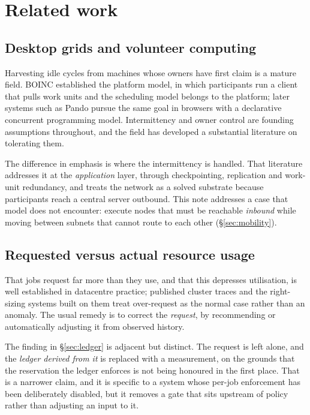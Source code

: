 \section{Related work}
\label{sec:related}

\subsection{Desktop grids and volunteer computing}

Harvesting idle cycles from machines whose owners have first claim is a mature
field. BOINC established the platform model, in which participants run a client
that pulls work units and the scheduling model belongs to the platform; later
systems such as Pando pursue the same goal in browsers with a declarative
concurrent programming model. Intermittency and owner control are founding
assumptions throughout, and the field has developed a substantial literature on
tolerating them.

The difference in emphasis is where the intermittency is handled. That
literature addresses it at the \emph{application} layer, through checkpointing,
replication and work-unit redundancy, and treats the network as a solved
substrate because participants reach a central server outbound. This note
addresses a case that model does not encounter: execute nodes that must be
reachable \emph{inbound} while moving between subnets that cannot route to each
other (\S\ref{sec:mobility}).

\subsection{Requested versus actual resource usage}

That jobs request far more than they use, and that this depresses utilisation,
is well established in datacentre practice; published cluster traces and the
right-sizing systems built on them treat over-request as the normal case rather
than an anomaly. The usual remedy is to correct the \emph{request}, by
recommending or automatically adjusting it from observed history.

The finding in \S\ref{sec:ledger} is adjacent but distinct. The request is left
alone, and the \emph{ledger derived from it} is replaced with a measurement, on
the grounds that the reservation the ledger enforces is not being honoured in
the first place. That is a narrower claim, and it is specific to a system whose
per-job enforcement has been deliberately disabled, but it removes a gate that
sits upstream of policy rather than adjusting an input to it.

